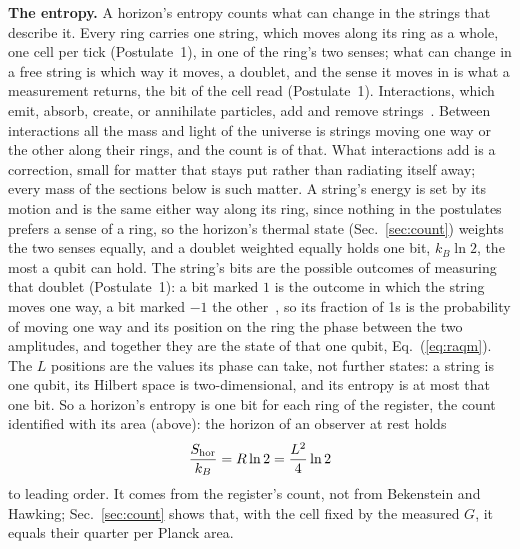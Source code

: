 \documentclass[aps,prd,twocolumn,superscriptaddress,nofootinbib,showkeys]{revtex4-2}
\begin{document}
\textbf{The entropy.} A horizon's entropy counts what can change in the strings that describe it. Every ring carries one string, which moves along its ring as a whole, one cell per tick (Postulate~1), in one of the ring's two senses; what can change in a free string is which way it moves, a doublet, and the sense it moves in is what a measurement returns, the bit of the cell read (Postulate~1). Interactions, which emit, absorb, create, or annihilate particles, add and remove strings~\cite{korytko2026d}. Between interactions all the mass and light of the universe is strings moving one way or the other along their rings, and the count is of that. What interactions add is a correction, small for matter that stays put rather than radiating itself away; every mass of the sections below is such matter. A string's energy is set by its motion and is the same either way along its ring, since nothing in the postulates prefers a sense of a ring, so the horizon's thermal state (Sec.~\ref{sec:count}) weights the two senses equally, and a doublet weighted equally holds one bit, $k_B\ln2$, the most a qubit can hold. The string's bits are the possible outcomes of measuring that doublet (Postulate~1): a bit marked $1$ is the outcome in which the string moves one way, a bit marked $-1$ the other~\cite{korytko2026c}, so its fraction of 1s is the probability of moving one way and its position on the ring the phase between the two amplitudes, and together they are the state of that one qubit, Eq.~(\ref{eq:raqm}). The $L$ positions are the values its phase can take, not further states: a string is one qubit, its Hilbert space is two-dimensional, and its entropy is at most that one bit. So a horizon's entropy is one bit for each ring of the register, the count identified with its area (above): the horizon of an observer at rest holds
\begin{equation}
\frac{S_{\rm hor}}{k_B} = R\ln2 = \frac{L^2}{4}\ln2
\label{eq:S}
\end{equation}
to leading order. It comes from the register's count, not from Bekenstein and Hawking; Sec.~\ref{sec:count} shows that, with the cell fixed by the measured $G$, it equals their quarter per Planck area.
\end{document}
